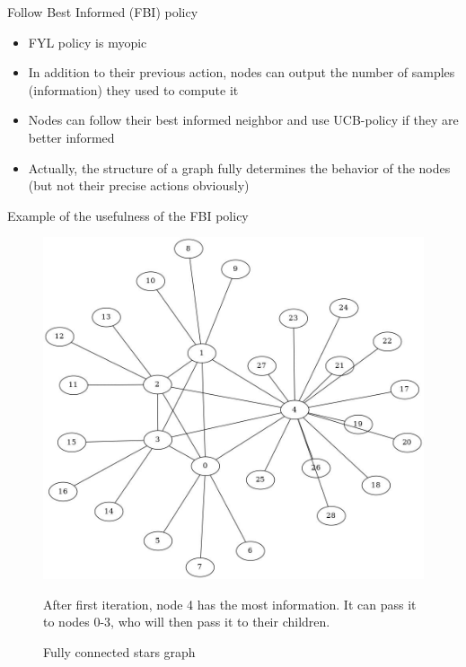 \documentclass{beamer}
\begin{document}
\begin{frame}{Follow Best Informed (FBI) policy}
\begin{itemize}
\item FYL policy is myopic 
\item In addition to their previous action, nodes can output the number of samples (information) they used to compute it
\item Nodes can \alert{follow their best informed neighbor and use UCB-policy if they are better informed}
\item Actually, the structure of a graph fully determines the behavior of the nodes (but not their precise actions obviously)
\end{itemize}
\end{frame}

\begin{frame}{Example of the usefulness of the FBI policy}
\begin{figure}
\includegraphics[scale=0.18]{fcstars}
\caption{\centering Fully connected stars graph}
After first iteration, node 4 has the most information. It can pass it to nodes 0-3, who will then pass it to their children. 
\end{figure}
\end{frame}
\end{document}
